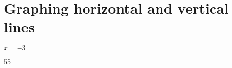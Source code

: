 \section{Graphing horizontal and vertical lines}


{
    $x = -3$
    \hfil
    \begin{myTikzpictureGrid}{0.35} {5}{5}
    \end{myTikzpictureGrid}
}
